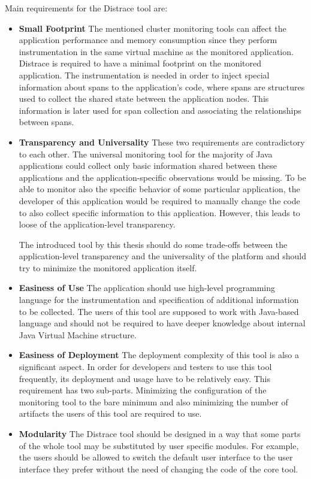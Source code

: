 Main requirements for the Distrace tool are:
\begin{itemize}
	\item \textbf{Small Footprint} \newline
	 The mentioned cluster monitoring tools can affect the application performance and memory consumption since they perform instrumentation in the same virtual machine as the monitored application. Distrace is required to have a minimal footprint on the monitored application. The instrumentation is needed in order to inject special information about spans to the application's code, where spans are structures used to collect the shared state between the application nodes. This information is later used for span collection and associating the relationships between spans.
	\item \textbf{Transparency and Universality} \newline
	These two requirements are contradictory to each other. The universal monitoring tool for the majority of Java applications could collect only basic information shared between these applications and the application-specific observations would be missing. To be able to monitor also the specific behavior of some particular application, the developer of this application would be required to manually change the code to also collect specific information to this application. However, this leads to loose of the application-level transparency. 
	
	The introduced tool by this thesis should do some trade-offs between the application-level transparency and the universality of the platform and should try to minimize the monitored application itself.
	
	\item \textbf{Easiness of Use} \newline
	The application should use high-level programming language for the instrumentation and specification of additional information to be collected. The users of this tool are supposed to work with Java-based language and should not be required to have deeper knowledge about internal Java Virtual Machine structure.
	\item \textbf{Easiness of Deployment} \newline
	The deployment complexity of this tool is also a significant aspect. In order for developers and testers to use this tool frequently, its deployment and usage have to be relatively easy. This requirement has two sub-parts. Minimizing the configuration of the monitoring tool to the bare minimum and also minimizing the number of artifacts the users of this tool are required to use.
	\item \textbf{Modularity} \newline
	The Distrace tool should be designed in a way that some parts of the whole tool may be substituted by user specific modules. For example, the users should be allowed to switch the default user interface to the user interface they prefer without the need of changing the code of the core tool.
\end{itemize}

